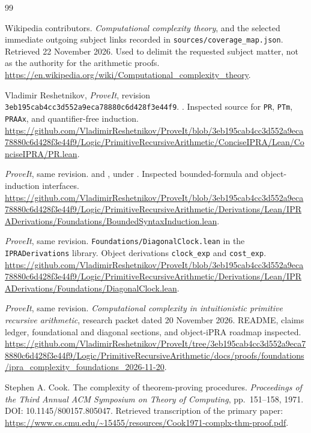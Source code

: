 \begin{thebibliography}{99}
Wikipedia contributors. \emph{Computational complexity theory}, and the selected immediate outgoing subject links recorded in \texttt{sources/coverage\_map.json}. Retrieved 22 November 2026. Used to delimit the requested subject matter, not as the authority for the arithmetic proofs.
\url{https://en.wikipedia.org/wiki/Computational_complexity_theory}.

Vladimir Reshetnikov, \emph{ProveIt}, revision \texttt{3eb195cab4cc3d552a9eca78880c6d428f3e44f9}. . Inspected source for \texttt{PR}, \texttt{PTm}, \texttt{PRAAx}, and quantifier-free induction.
\url{https://github.com/VladimirReshetnikov/ProveIt/blob/3eb195cab4cc3d552a9eca78880c6d428f3e44f9/Logic/PrimitiveRecursiveArithmetic/ConciseIPRA/Lean/ConciseIPRA/PR.lean}.

\emph{ProveIt}, same revision.  and , under . Inspected bounded-formula and object-induction interfaces.
\url{https://github.com/VladimirReshetnikov/ProveIt/blob/3eb195cab4cc3d552a9eca78880c6d428f3e44f9/Logic/PrimitiveRecursiveArithmetic/Derivations/Lean/IPRADerivations/Foundations/BoundedSyntaxInduction.lean}.

\emph{ProveIt}, same revision. \texttt{Foundations/DiagonalClock.lean} in the \texttt{IPRADerivations} library. Object derivations \texttt{clock\_exp} and \texttt{cost\_exp}.
\url{https://github.com/VladimirReshetnikov/ProveIt/blob/3eb195cab4cc3d552a9eca78880c6d428f3e44f9/Logic/PrimitiveRecursiveArithmetic/Derivations/Lean/IPRADerivations/Foundations/DiagonalClock.lean}.

\emph{ProveIt}, same revision. \emph{Computational complexity in intuitionistic primitive recursive arithmetic}, research packet dated 20 November 2026. README, claims ledger, foundational and diagonal sections, and object-iPRA roadmap inspected.
\url{https://github.com/VladimirReshetnikov/ProveIt/tree/3eb195cab4cc3d552a9eca78880c6d428f3e44f9/Logic/PrimitiveRecursiveArithmetic/docs/proofs/foundations/ipra_complexity_foundations_2026-11-20}.

Stephen A. Cook. The complexity of theorem-proving procedures. \emph{Proceedings of the Third Annual ACM Symposium on Theory of Computing}, pp.~151--158, 1971. DOI: 10.1145/800157.805047. Retrieved transcription of the primary paper:
\url{https://www.cs.cmu.edu/~15455/resources/Cook1971-complx-thm-proof.pdf}.


\end{thebibliography}
